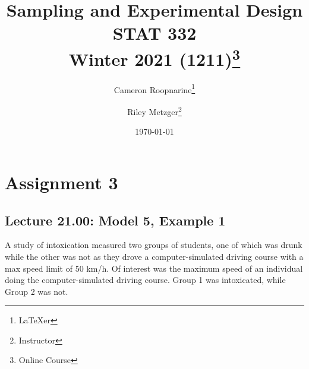 \documentclass[oneside]{book}\usepackage[]{graphicx}\usepackage[dvipsnames,table,xcdraw]{xcolor}
\title{
\LARGE Sampling and Experimental Design\\
\large STAT 332\\
\normalsize Winter 2021 (1211)\thanks{Online Course}}
\author{Cameron Roopnarine\thanks{\LaTeX{}er}\and Riley Metzger\thanks{Instructor}}%
\date{\today}
\begin{document}
\maketitle

\tableofcontents








\chapter{Assignment 3}
\section{Lecture 21.00: Model 5, Example 1}\label{section21}
A study of intoxication measured two groups of students,
one of which was drunk while the other was not as
they drove a computer-simulated driving course with a max speed limit of 50 km/h.
Of interest was the maximum speed of an individual doing the computer-simulated driving
course. Group 1 was intoxicated, while Group 2 was not.
\end{document}
